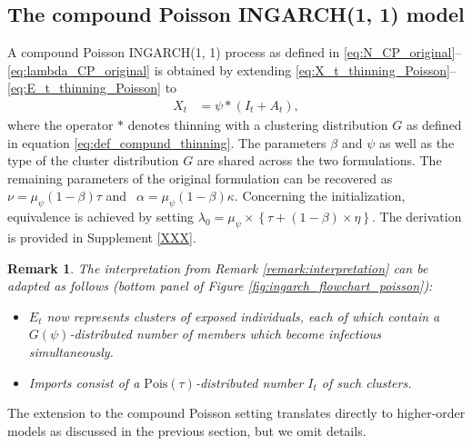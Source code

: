 \documentclass{article}
\newtheorem{remark}{Remark}
\begin{document}
%


\subsection{The compound Poisson INGARCH(1, 1) model}
\label{subsec:compound}

A compound Poisson INGARCH(1, 1) process as defined in \eqref{eq:N_CP_original}--\eqref{eq:lambda_CP_original} is obtained by extending \eqref{eq:X_t_thinning_Poisson}--\eqref{eq:E_t_thinning_Poisson} to
\begin{align}
X_t & = \psi * (I_t + A_t)\label{eq:X_t_CP},
\end{align}
where the operator $*$ denotes thinning with a clustering distribution $G$ as defined in equation \eqref{eq:def_compund_thinning}.
The parameters $\beta$ and $\psi$ as well as the type of the cluster distribution $G$ are shared across the two formulations. The remaining parameters of the original formulation can be recovered as
$
\nu = \mu_\psi(1 - \beta)\tau$ and $ \ \
\alpha = \mu_\psi(1 - \beta)\kappa.
$
Concerning the initialization, equivalence is achieved by setting $\lambda_0 = \mu_\psi\times \left\{\tau + (1 - \beta) \times \eta\right\}$. The derivation is provided in Supplement \ref{XXX}.

\begin{remark}
The interpretation from Remark \ref{remark:interpretation} can be adapted as follows (bottom panel of Figure \ref{fig:ingarch_flowchart_poisson}):
\begin{itemize}
\item $E_t$ now represents clusters of exposed individuals, each of which contain a $G(\psi)$-distributed number of members which become infectious simultaneously.
\item Imports consist of a $\text{Pois}(\tau)$-distributed number $I_t$ of such clusters.
\end{itemize}
\end{remark}
The extension to the compound Poisson setting translates directly to higher-order models as discussed in the previous section, but we omit details.
\end{document}
